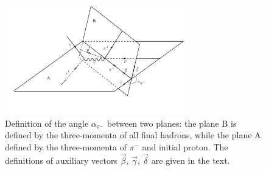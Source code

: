 \documentclass[prc,twocolumn,superscriptaddress,showpacs,amssymb,amsmath,amsfonts,linenumbers,aps]{revtex4-1}
\begin{document}
\begin{figure}[htp]
\begin{center}
\includegraphics[width=8cm]{pictures/angles/alpha1.pdf}
\caption{\small Definition of the angle $\alpha_{\pi^{-}}$ between two planes: the plane B is defined by the three-momenta of all final hadrons, while the plane A defined by  the three-momenta of $\pi^{-}$ and initial proton. The definitions of  auxiliary vectors $\vec \beta$, $\vec \gamma$, $\vec \delta$ are given in the text.} \label{fig:cr_sec_kinematic2}
\end{center}
\end{figure}
\end{document}
